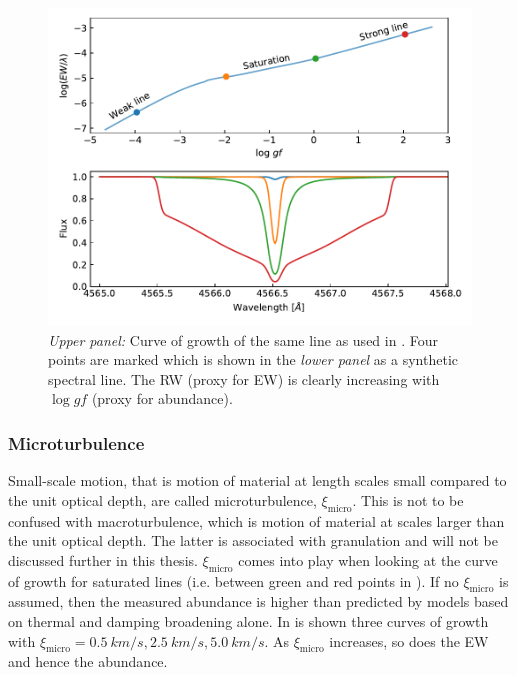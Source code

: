 \begin{figure}[htpb!]
    \centering
    \includegraphics[width=0.85\linewidth]{figures/cog.pdf}
    \caption{\emph{Upper panel:} Curve of growth of the same  line as used in
                                 . Four points are marked which is shown in the
             \emph{lower panel} as a synthetic spectral line. The RW (proxy for EW) is clearly
                                increasing with $\log \mathit{gf}$ (proxy for abundance).}
    \label{fig:cog}
\end{figure}


\subsubsection{Microturbulence}

Small-scale motion, that is motion of material at length scales small compared to the unit optical
depth, are called microturbulence, $\xi_\mathrm{micro}$. This is not to be confused with
macroturbulence, which is motion of material at scales larger than the unit optical depth. The
latter is associated with granulation and will not be discussed further in this thesis.
$\xi_\mathrm{micro}$ comes into play when looking at the curve of growth for saturated lines (i.e.
between green and red points in ). If no $\xi_\mathrm{micro}$ is assumed, then the
measured abundance is higher than predicted by models based on thermal and damping broadening alone.
In  is shown three curves of growth with $\xi_\mathrm{micro}={\SI{0.5}{km/s},
\SI{2.5}{km/s}, \SI{5.0}{km/s}}$. As $\xi_\mathrm{micro}$ increases, so does the EW and hence the
abundance.

